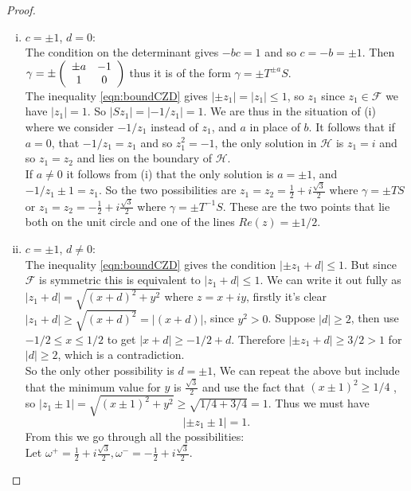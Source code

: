 \begin{proof}
\begin{enumerate}[(i)]
\item $c = \pm 1$, $d = 0$: \\
The condition on the determinant gives $-bc = 1$ and so $c = -b = \pm 1$. Then $\gamma = \pm \left(\begin{array}{ c c } \pm a &  -1 \\ 1 & 0 \end{array} \right)$ thus it is of the form $\gamma = \pm T^{\pm a}S$. \\

The inequality \ref{eqn:boundCZD} gives $|\pm z_1 | = |z_1| \leq 1$, so $z_1$ since $z_1 \in \mathcal{F}$ we have $|z_1| = 1$. So $|Sz_1| = |-1/z_1| =1$. We are thus in the situation of (i) where we consider $-1/z_1$ instead of $z_1$, and $a$ in place of $b$. It follows that if $a = 0$, that $-1/z_1 = z_1$ and so $z_1^2 = -1$, the only solution in $\mathcal{H}$ is $z_1 = i$ and so $z_1= z_2$ and lies on the boundary of $\mathcal{H}$. \\
If $a \neq 0$ it follows from (i) that the only solution is $a = \pm 1$, and $-1/z_1 \pm 1 = z_1$. So the two possibilities are $z_1 = z_2 = \frac{1}{2} + i \frac{\sqrt{3}}{2}$ where $\gamma = \pm TS$ or $z_1 = z_2 = -\frac{1}{2} + i \frac{\sqrt{3}}{2}$ where $\gamma = \pm T^{-1}S$. These are the two points that lie both on the unit circle and one of the lines $Re(z)= \pm 1/2$. 

\item $c = \pm 1$, $d \neq 0$: \\
The inequality \ref{eqn:boundCZD} gives the condition $ |\pm z_1 +d | \leq 1$. But since $\mathcal{F}$ is symmetric this is equivalent to $|z_1 + d |\leq 1$. We can write it out fully as $|z_1 + d| = \sqrt{(x +d)^2 + y^2}$ where $z = x + iy$, firstly it's clear $|z_1 + d| \geq   \sqrt{(x +d)^2} = |(x +d)|$, since $y^2 > 0$. Suppose $|d| \geq 2$, then use $ -1/2 \leq x \leq 1/2$ to get $|x+d| \geq -1/2 +d$. Therefore $|\pm z_1 + d| \geq 3/2 > 1$ for $|d| \geq 2$, which is a contradiction. \\
So the only other possibility is $d = \pm 1$, We can repeat the above but include that the minimum value for $y$ is $\frac{\sqrt{3}}{2}$ and use the fact that $(x \pm 1)^2 \geq 1/4$ , so $|z_1 \pm 1| =\sqrt{(x \pm 1)^2 + y^2} \geq \sqrt{1/4 + 3/4} = 1$. Thus we must have 
$$|\pm z_1 \pm 1| = 1.$$
From this we go through all the possibilities: \\
Let $\omega^+ = \frac{1}{2} + i \frac{\sqrt{3}}{2}, \omega^- = -\frac{1}{2} + i \frac{\sqrt{3}}{2}$.
\begin{itemize}


\end{itemize}
\end{enumerate}
\end{proof}
